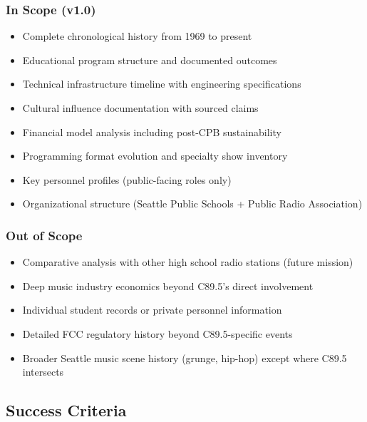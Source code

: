 \documentclass[11pt,letterpaper]{article}
\begin{document}
\subsubsection{In Scope (v1.0)}
\begin{itemize}[leftmargin=2em]
\item Complete chronological history from 1969 to present
\item Educational program structure and documented outcomes
\item Technical infrastructure timeline with engineering specifications
\item Cultural influence documentation with sourced claims
\item Financial model analysis including post-CPB sustainability
\item Programming format evolution and specialty show inventory
\item Key personnel profiles (public-facing roles only)
\item Organizational structure (Seattle Public Schools + Public Radio Association)
\end{itemize}

\subsubsection{Out of Scope}
\begin{itemize}[leftmargin=2em]
\item Comparative analysis with other high school radio stations (future mission)
\item Deep music industry economics beyond C89.5's direct involvement
\item Individual student records or private personnel information
\item Detailed FCC regulatory history beyond C89.5-specific events
\item Broader Seattle music scene history (grunge, hip-hop) except where C89.5 intersects
\end{itemize}

\subsection{Success Criteria}
\end{document}
